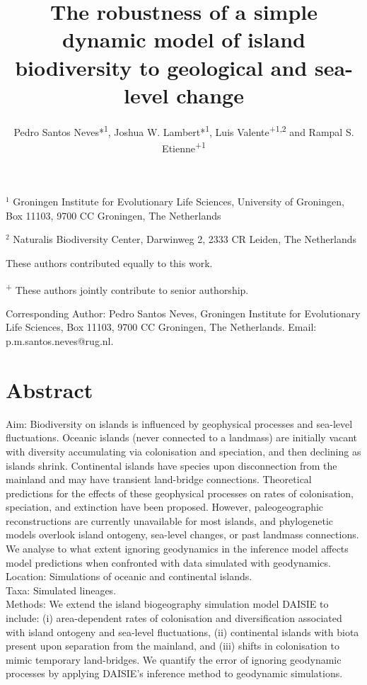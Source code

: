 \documentclass{article}
\title{The robustness of a simple dynamic model of island biodiversity to geological and sea-level change}
\author{Pedro Santos Neves*\textsuperscript{1}, Joshua W. Lambert*\textsuperscript{1}, Luis Valente\textsuperscript{+1,2} and Rampal S. Etienne\textsuperscript{+1}}
\date{}
\begin{document}
\maketitle

\noindent $^{1}$ Groningen Institute for Evolutionary Life Sciences, University of
Groningen, Box 11103, 9700 CC Groningen, The Netherlands

\noindent $^{2}$ Naturalis Biodiversity Center, Darwinweg 2, 2333 CR Leiden, The Netherlands 

\noindent * These authors contributed equally to this work.

\noindent \textsuperscript{+} These authors jointly contribute to senior authorship.

\noindent Corresponding Author: Pedro Santos Neves, Groningen Institute for Evolutionary Life Sciences, Box 11103, 9700 CC Groningen, The Netherlands. Email: p.m.santos.neves@rug.nl.

\section*{Abstract}

Aim: Biodiversity on islands is influenced by geophysical processes and sea-level fluctuations. Oceanic islands (never connected to a landmass) are initially vacant with diversity accumulating via colonisation and speciation, and then declining as islands shrink. Continental islands have species upon disconnection from the mainland and may have transient land-bridge connections. Theoretical predictions for the effects of these geophysical processes on rates of colonisation, speciation, and extinction have been proposed. However, paleogeographic reconstructions are currently unavailable for most islands, and phylogenetic models overlook island ontogeny, sea-level changes, or past landmass connections. We analyse to what extent ignoring geodynamics in the inference model affects model predictions when confronted with data simulated with geodynamics. \\

\noindent Location: Simulations of oceanic and continental islands. \\

\noindent Taxa: Simulated lineages. \\

\noindent Methods: We extend the island biogeography simulation model DAISIE to include: (i) area-dependent rates of colonisation and diversification associated with island ontogeny and sea-level fluctuations, (ii) continental islands with biota present upon separation from the mainland, and (iii) shifts in colonisation to mimic temporary land-bridges. We quantify the error of ignoring geodynamic processes by applying DAISIE’s inference method to geodynamic simulations. \\
\end{document}

